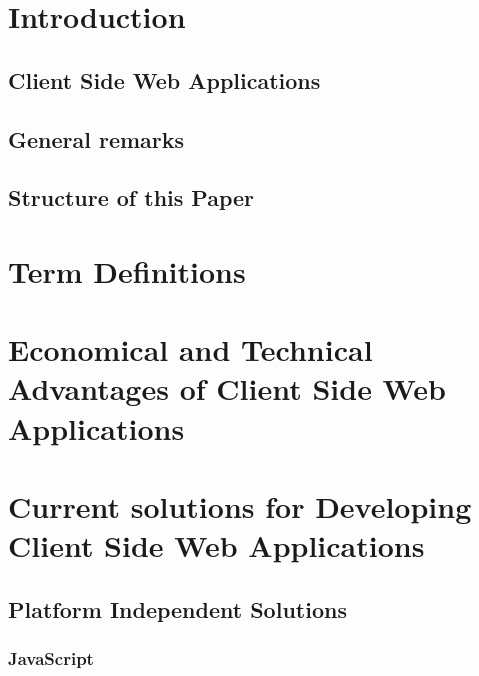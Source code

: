 

\tableofcontents
\newpage

\listoffigures

\chapter{Introduction}
 
 
 \section{Client Side Web Applications}
 \section{General remarks}
 \section{Structure of this Paper}
 
  
  
\chapter{Term Definitions}

\chapter{Economical and Technical Advantages of Client Side Web Applications}
 \label{sec:advantages}
 
 
\chapter{Current solutions for Developing Client Side Web Applications}
 \label{sec:currentSolutionsCSWA}
 

 \section{Platform Independent Solutions}
  
  
   
  \subsection{JavaScript}
   
   
    
